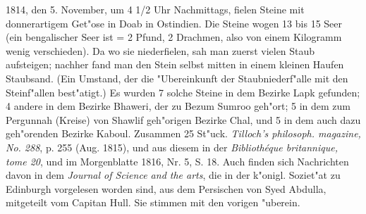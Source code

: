 \documentclass[a4paper, 11pt, oneside, polutonikogreek, german]{article}
\begin{document}
1814, den 5. November, um 4 1/2 Uhr Nachmittags, fielen Steine mit donnerartigem Get"ose in Doab in Ostindien. Die Steine wogen 13 bis 15 Seer (ein bengalischer Seer ist = 2 Pfund, 2 Drachmen, also von einem Kilogramm wenig verschieden). Da wo sie niederfielen, sah man zuerst vielen Staub aufsteigen; nachher fand man den Stein selbst mitten in einem kleinen Haufen Staubsand. (Ein Umstand, der die "Ubereinkunft der Staubniederf"alle mit den Steinf"allen best"atigt.) Es wurden 7 solche Steine in dem Bezirke Lapk gefunden; 4 andere in dem Bezirke Bhaweri, der zu Bezum Sumroo geh"ort; 5 in dem zum Pergunnah (Kreise) von Shawlif geh"origen Bezirke Chal, und 5 in dem auch dazu geh"orenden Bezirke Kaboul. Zusammen 25 St"uck. \emph{Tilloch's philosoph. magazine, No. 288}, p. 255 (Aug. 1815), und aus diesem in der \emph{Bibliothéque britannique, tome 20}, und im Morgenblatte 1816, Nr. 5, S. 18. Auch finden sich Nachrichten davon in dem \emph{Journal of Science and the arts}, die in der k"onigl. Soziet"at zu Edinburgh vorgelesen worden sind, aus dem Persischen von Syed Abdulla, mitgeteilt vom Capitan Hull. Sie stimmen mit den vorigen "uberein.
\end{document}
